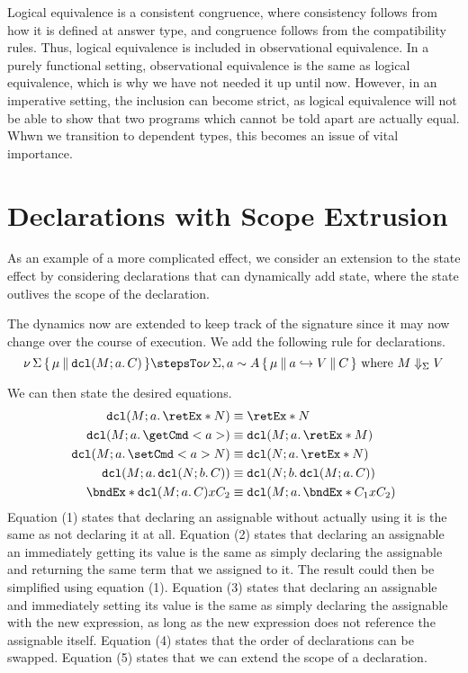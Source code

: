 \documentclass[letterpaper]{article}
\newcommand{\mapsVal}[2]{#1 \hookrightarrow #2}
\newcommand\dmemCons{\mathbin\Vert}
\begin{document}
Logical equivalence is a consistent congruence, where consistency follows from how it is defined at answer type, and congruence follows from the compatibility rules.
Thus, logical equivalence is included in observational equivalence.
In a purely functional setting, observational equivalence is the same as logical equivalence, which is why we have not needed it up until now.
However, in an imperative setting, the inclusion can become strict, as logical equivalence will not be able to show that two programs which cannot be told apart are actually equal.
Whwn we transition to dependent types, this becomes an issue of vital importance.

\section{Declarations with Scope Extrusion}

As an example of a more complicated effect, we consider an extension to the state effect by considering declarations that can dynamically add state, where the state outlives the scope of the declaration.

The dynamics now are extended to keep track of the signature since it may now change over the course of execution.
We add the following rule for declarations.
\[\dmemState{\Sigma}{\mu}{\dcl{M}{a}{C}} \stepsTo \dmemState{\Sigma, a \sim A}{\mu \dmemCons \mapsVal{a}{V}}{C} \text{ where } M \Downarrow_\Sigma V\]

We can then state the desired equations.
\begin{align}
\dcl{M}{a}{\retEx*{N}} &\equiv \retEx*{N} \\
\dcl{M}{a}{\getCmd<a>} &\equiv \dcl{M}{a}{\retEx*{M}} \\
\dcl{M}{a}{\setCmd<a>{N}} &\equiv \dcl{N}{a}{\retEx*{N}} \\
\dcl{M}{a}{\dcl{N}{b}{C}} &\equiv \dcl{N}{b}{\dcl{M}{a}{C}} \\
\bndEx*{\dcl{M}{a}{C}}{x}{C_2} &\equiv \dcl{M}{a}{\bndEx*{C_1}{x}{C_2}}
\end{align}
Equation (1) states that declaring an assignable without actually using it is the same as not declaring it at all.
Equation (2) states that declaring an assignable an immediately getting its value is the same as simply declaring the assignable and returning the same term that we assigned to it.
The result could then be simplified using equation (1).
Equation (3) states that declaring an assignable and immediately setting its value is the same as simply declaring the assignable with the new expression, as long as the new expression does not reference the assignable itself.
Equation (4) states that the order of declarations can be swapped.
Equation (5) states that we can extend the scope of a declaration.
\end{document}
